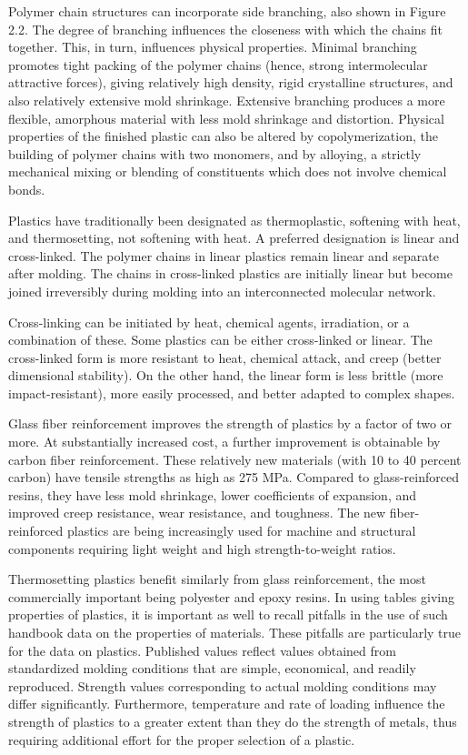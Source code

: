 \documentclass[a4paper,openany,12pt]{book}
\begin{document}
Polymer chain structures can incorporate side branching, also shown in
Figure 2.2. The degree of branching influences the closeness with which
the chains fit together. This, in turn, influences physical properties.
Minimal branching promotes tight packing of the polymer chains (hence,
strong intermolecular attractive forces), giving relatively high
density, rigid crystalline structures, and also relatively extensive
mold shrinkage. Extensive branching produces a more flexible, amorphous
material with less mold shrinkage and distortion. Physical properties of
the finished plastic can also be altered by copolymerization, the
building of polymer chains with two monomers, and by alloying, a
strictly mechanical mixing or blending of constituents which does not
involve chemical bonds.

Plastics have traditionally been designated as thermoplastic, softening
with heat, and thermosetting, not softening with heat. A preferred
designation is linear and cross-linked. The polymer chains in linear
plastics remain linear and separate after molding. The chains in
cross-linked plastics are initially linear but become joined
irreversibly during molding into an interconnected molecular network.

Cross-linking can be initiated by heat, chemical agents, irradiation, or
a combination of these. Some plastics can be either cross-linked or
linear. The cross-linked form is more resistant to heat, chemical
attack, and creep (better dimensional stability). On the other hand, the
linear form is less brittle (more impact-resistant), more easily
processed, and better adapted to complex shapes.

Glass fiber reinforcement improves the strength of plastics by a factor
of two or more. At substantially increased cost, a further improvement
is obtainable by carbon fiber reinforcement. These relatively new
materials (with 10 to 40 percent carbon) have tensile strengths as high
as 275 MPa. Compared to glass-reinforced resins, they have less mold
shrinkage, lower coefficients of expansion, and improved creep
resistance, wear resistance, and toughness. The new fiber-reinforced
plastics are being increasingly used for machine and structural
components requiring light weight and high strength-to-weight ratios.

Thermosetting plastics benefit similarly from glass reinforcement, the
most commercially important being polyester and epoxy resins. In using
tables giving properties of plastics, it is important as well to recall
pitfalls in the use of such handbook data on the properties of
materials. These pitfalls are particularly true for the data on
plastics. Published values reflect values obtained from standardized
molding conditions that are simple, economical, and readily reproduced.
Strength values corresponding to actual molding conditions may differ
significantly. Furthermore, temperature and rate of loading influence
the strength of plastics to a greater extent than they do the strength
of metals, thus requiring additional effort for the proper selection of
a plastic.
\end{document}
